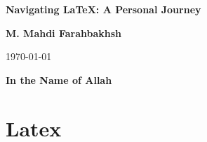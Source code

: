 \documentclass{report}
\begin{document}
	
	\begin{titlepage}
		
		\centering
		\vspace*{2cm}
		\textbf{\LARGE Navigating LaTeX: A Personal Journey}
		\vspace{1cm}
		
		
		
		\vfill
		
		\textbf{M. Mahdi Farahbakhsh}
		
		\vspace{1cm}
		\today
	\end{titlepage}
	
	
	\begin{center}
		\textbf{In the Name of Allah}
	\end{center}
	
		\section{Latex}
	
\end{document}
